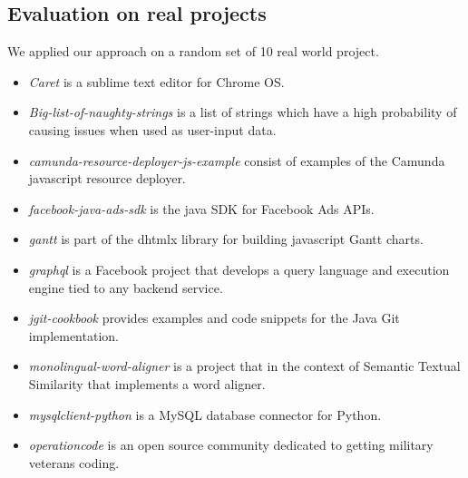 \subsection{Evaluation on real projects}
\label{subsec:eval-real-proj}

We applied our approach on a random set of 10 real world project.


\begin{itemize}
	\item \emph{Caret} is a sublime text editor for Chrome OS.
	\item \emph{Big-list-of-naughty-strings} is a list of strings which have a high probability of causing issues when used as user-input data. 
	\item \emph{camunda-resource-deployer-js-example} consist of examples of the Camunda javascript resource deployer. 
	\item \emph{facebook-java-ads-sdk} is the java SDK for Facebook Ads APIs. 
	\item \emph{gantt} is part of the dhtmlx library for building javascript Gantt charts. 
	\item \emph{graphql} is a Facebook project that develops a query language and execution engine tied to any backend service. 
	\item \emph{jgit-cookbook} provides examples and code snippets for the Java Git implementation. 
	\item \emph{monolingual-word-aligner} is a project that in the context of Semantic Textual Similarity that implements a word aligner. 
	\item \emph{mysqlclient-python} is a MySQL database connector for Python. 
	\item \emph{operationcode} is an open source community dedicated to getting military veterans coding.
\end{itemize}

